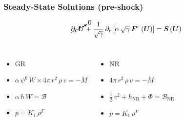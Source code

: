 \documentclass{beamer}
\newcommand{\p}{\partial}
\newcommand{\bs}{\boldsymbol}
\newcommand{\nr}{\mathrm{NR}}
\newcommand{\mdot}{\dot{M}}
\begin{document}
\begin{frame}
\frametitle{Steady-State Solutions (pre-shock)}

  \begin{equation*}
    \cancelto{0}{\p_{t}\,\bs{U}}
    +\frac{1}{\sqrt{\gamma}}\,
    \p_{r}\left[\alpha\,\sqrt{\gamma}\,\bs{F}^{r}\left(\bs{U}\right)\right]
    =\bs{S}\left(\bs{U}\right)
  \end{equation*}

  \begin{columns}[c]


    \begin{itemize}[<+->]
      \item[]
        GR
      \item[]
        $\alpha\,\psi^{6}\,W\times4\pi\,r^{2}\,\rho\,v=-\mdot$
      \item[]
        $\alpha\,h\,W=\mathcal{B}$
      \item[]
        $p=K_{1}\,\rho^{\Gamma}$
    \end{itemize}


    \begin{itemize}[<+->]
      \item[]
        NR
      \item[]
        $4\pi\,r^{2}\,\rho\,v=-\mdot$
      \item[]
        $\frac{1}{2}\,v^{2}+h_{\nr}+\Phi=\mathcal{B}_{\nr}$
      \item[]
        $p=K_{1}\,\rho^{\Gamma}$
    \end{itemize}

  \end{columns}

\end{frame}
\end{document}
